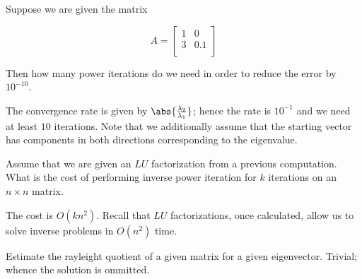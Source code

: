 \documentclass[../main.tex]{subfiles}
\begin{document}
\begin{problem}
    Suppose we are given the matrix

    \[
        A = \begin{bmatrix}
            1 & 0 \\
            3 & 0.1 \\
        \end{bmatrix}
    \]

    Then how many power iterations do we need in order to reduce the error by $10^{-10}$.
\end{problem}
\begin{solution}
    The convergence rate is given by $\abs{\frac{\lambda_2}{\lambda_1}}$; hence the rate is $10^{-1}$ and we need at least $10$ iterations. Note that we additionally assume that the starting vector has components in both directions corresponding to the eigenvalue.
\end{solution}

\begin{problem}
    Assume that we are given an $LU$ factorization from a previous computation. What is the cost of performing inverse power iteration for $k$ iterations on an $n \times n$ matrix.
\end{problem}

\begin{solution}
    The cost is $O(kn^2)$. Recall that $LU$ factorizations, once calculated, allow us to solve inverse problems in $O(n^2)$ time.
\end{solution}

\begin{problem}
    Estimate the rayleight quotient of a given matrix for a given eigenvector. Trivial; whence the solution is ommitted.
\end{problem}
\end{document}
